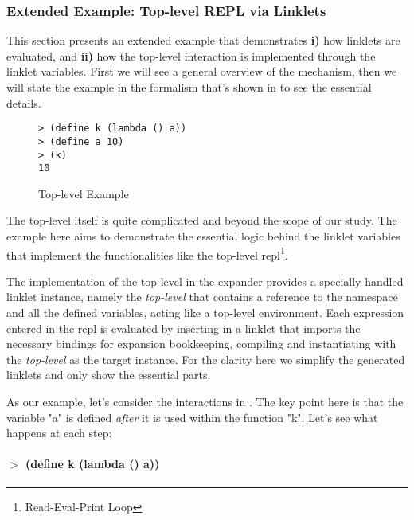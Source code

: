 \subsubsection{Extended Example: Top-level REPL via Linklets}
\label{subsec:toplevel-example}

This section presents an extended example that demonstrates
\textbf{i)} how linklets are evaluated, and \textbf{ii)} how the
top-level interaction is implemented through the linklet
variables. First we will see a general overview of the mechanism, then
we will state the example in the formalism that's shown in
 to see the essential details.

\begin{wrapfigure}{r}{0.3\textwidth}
  \vspace{-0.5cm}
  \begin{mdframed}
    \begin{verbatim}
> (define k (lambda () a))
> (define a 10)
> (k)
10
\end{verbatim}
    \caption{Top-level Example}
    \label{fig:toplevel-interaction}
  \end{mdframed}
\end{wrapfigure}

The top-level itself is quite complicated and beyond the scope of our
study. The example here aims to demonstrate the essential logic behind
the linklet variables that implement the functionalities like the
top-level repl\footnote{Read-Eval-Print Loop}.

The implementation of the top-level in the expander provides a
specially handled linklet instance, namely the \emph{top-level} that
contains a reference to the namespace and all the defined variables,
acting like a top-level environment. Each expression entered in the
repl is evaluated by inserting in a linklet that imports the necessary
bindings for expansion bookkeeping, compiling and instantiating with
the \emph{top-level} as the target instance. For the clarity here we
simplify the generated linklets and only show the essential parts.

As our example, let's consider the interactions in
. The key point here is that the
variable "a" is defined \emph{after} it is used within the function
"k". Let's see what happens at each step:

\paragraph{$>$ (define k (lambda () a))}

